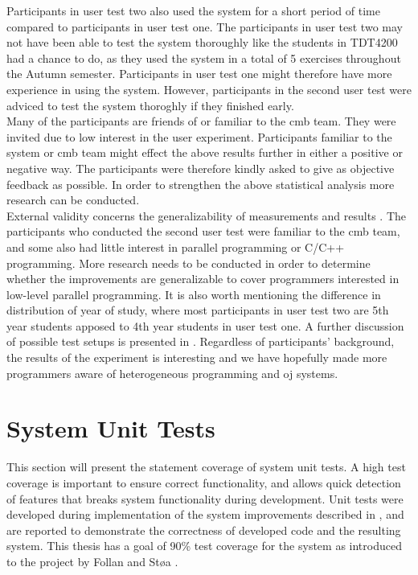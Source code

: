 Participants in user test two also used the system for a short period of time compared to participants in user test one. The participants in user test two may not have been able to test the system thoroughly like the students in TDT4200 had a chance to do, as they used the system in a total of 5 exercises throughout the Autumn semester. Participants in user test one might therefore have more experience in using the system. However, participants in the second user test were adviced to test the system thoroghly if they finished early.\\

Many of the participants are friends of or familiar to the \gls{cmb} team. They were invited due to low interest in the user experiment. Participants familiar to the system or \gls{cmb} team might effect the above results further in either a positive or negative way. The participants were therefore kindly asked to give as objective feedback as possible. In order to strengthen the above statistical analysis more research can be conducted. \\

External validity concerns the generalizability of measurements and results \cite{Oates2006}. The participants who conducted the second user test were familiar to the \gls{cmb} team, and some also had little interest in parallel programming or C/C++ programming. More research needs to be conducted in order to determine whether the improvements are generalizable to cover programmers interested in low-level parallel programming. It is also worth mentioning the difference in distribution of year of study, where most participants in user test two are 5th year students apposed to 4th year students in user test one. A further discussion of possible test setups is presented in . Regardless of participants' background, the results of the experiment is interesting and we have hopefully made more programmers aware of heterogeneous programming and \gls{oj} systems. \\

\section{System Unit Tests}
\label{sec:system-unit-tests}
This section will present the statement coverage of system unit tests. A high test coverage is important to ensure correct functionality, and allows quick detection of features that breaks system functionality during development. Unit tests were developed during implementation of the system improvements described in , and are reported to demonstrate the correctness of developed code and the resulting system. This thesis has a goal of 90\% test coverage for the system as introduced to the project by Follan and Støa \cite{mt:T&S}. \\

